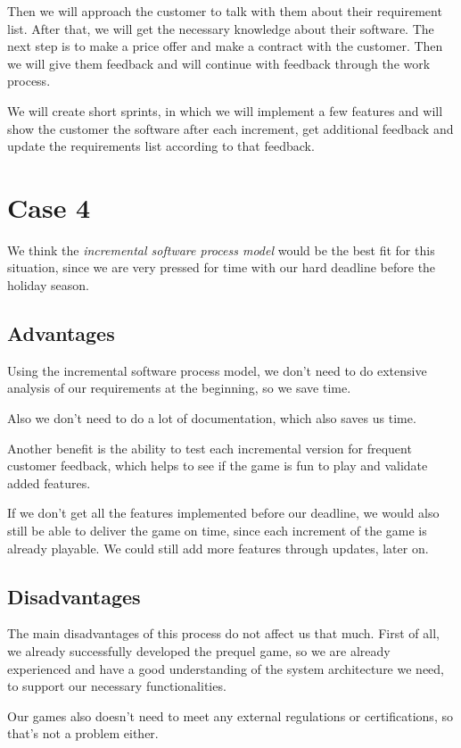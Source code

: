 \documentclass[a4paper, 12pt]{article}
\begin{document}
Then we will approach the customer to talk with them about their requirement list. After that, we will get the necessary knowledge about their software. The next step is to make a price offer and make a contract with the customer. Then we will give them feedback and will continue with feedback through the work process.

We will create short sprints, in which we will implement a few features and will show the customer the software after each increment, get additional feedback and update the requirements list according to that feedback.

\newpage
\section{Case 4}
We think the \emph{incremental software process model} would be the best fit for this situation, since we are very pressed for time with our hard deadline before the holiday season.

\subsection{Advantages}
Using the incremental software process model, we don't need to do extensive analysis of our requirements at the beginning, so we save time.

Also we don't need to do a lot of documentation, which also saves us time.

Another benefit is the ability to test each incremental version for frequent customer feedback, which helps to see if the game is fun to play and validate added features.

If we don't get all the features implemented before our deadline, we would also still be able to deliver the game on time, since each increment of the game is already playable. We could still add more features through updates, later on.

\subsection{Disadvantages}
The main disadvantages of this process do not affect us that much. First of all, we already successfully developed the prequel game, so we are already experienced and have a good understanding of the system architecture we need, to support our necessary functionalities.

Our games also doesn't need to meet any external regulations or certifications, so that's not a problem either.
\end{document}
